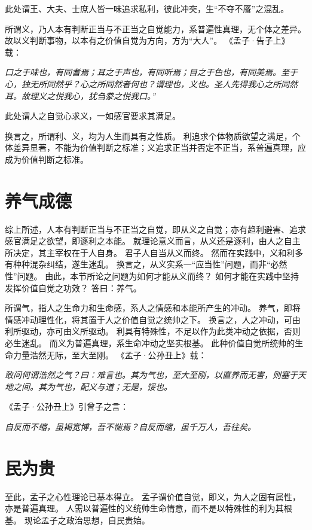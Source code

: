 \documentclass[11pt]{article}
\begin{document}
此处谓王、大夫、士庶人皆一味追求私利，彼此冲突，生“不夺不餍”之混乱。

\newline

所谓义，乃人本有判断正当与不正当之自觉能力，系普遍性真理，无个体之差异。
故以义判断事物，以本有之价值自觉为方向，方为“大人”。
《孟子·告子上》载：

\textit{口之于味也，有同耆焉；耳之于声也，有同听焉；目之于色也，有同美焉。至于心，独无所同然乎？心之所同然者何也？谓理也，义也。圣人先得我心之所同然耳。故理义之悦我心，犹刍豢之悦我口。”}

此处谓人之自觉心求义，一如感官要求其满足。

\newline

换言之，所谓利、义，均为人生而具有之性质。
利追求个体物质欲望之满足，个体差异显著，不能为价值判断之标准；义追求正当并否定不正当，系普遍真理，应成为价值判断之标准。
  
\section{养气成德}
综上所述，人本有判断正当与不正当之自觉，即从义之自觉；亦有趋利避害、追求感官满足之欲望，即逐利之本能。
就理论意义而言，从义还是逐利，由人之自主所决定，其主宰权在于人自身。
君子人自当从义而终。
然而在实践中，义和利多有种种混杂纠结，遂生迷乱。
换言之，从义实系一“应当性”问题，而非“必然性”问题。
由此，本节所论之问题为如何才能从义而终？
如何才能在实践中坚持发挥价值自觉之功效？
答曰：养气。

\newline

所谓气，指人之生命力和生命感，系人之情感和本能所产生的冲动。
养气，即将情感冲动理性化，将其置于人之价值自觉之统帅之下。
换言之，人之冲动，可由利所驱动，亦可由义所驱动。
利具有特殊性，不足以作为此类冲动之依据，否则必生迷乱。
而义为普遍真理，系生命冲动之坚实根基。
此种价值自觉所统帅的生命力量浩然无际，至大至刚。
《孟子·公孙丑上》载：

\textit{敢问何谓浩然之气？曰：难言也。其为气也，至大至刚，以直养而无害，则塞于天地之间。其为气也，配义与道；无是，馁也。}

《孟子·公孙丑上》引曾子之言：

\textit{自反而不缩，虽褐宽博，吾不惴焉？自反而缩，虽千万人，吾往矣。}

  
\section{民为贵}
至此，孟子之心性理论已基本得立。
孟子谓价值自觉，即义，为人之固有属性，亦是普遍真理。
人需以普遍性的义统帅生命情意，而不是以特殊性的利为其根基。
现论孟子之政治思想，自民贵始。
\end{document}

